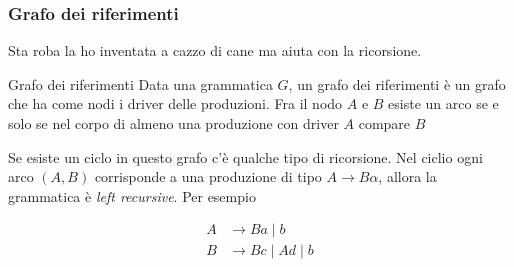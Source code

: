 \subsubsection{Grafo dei riferimenti}\label{grafo dei riferimenti}
Sta roba la ho inventata a cazzo di cane ma aiuta con la ricorsione. 
\begin{definizione}{Grafo dei riferimenti}
	Data una grammatica $ G $, un grafo dei riferimenti è un grafo che ha come nodi i driver delle produzioni.
	Fra il nodo $ A $  e $ B $ esiste un arco se e solo se nel corpo di almeno una produzione con driver $ A $ compare $ B $
\end{definizione}
Se esiste un ciclo in questo grafo c'è qualche tipo di ricorsione. Nel ciclio ogni arco $ \left(A,B\right) $ corrisponde a una produzione di tipo $ A \rightarrow B \alpha $, allora la grammatica è \textit{left recursive}. Per esempio
\vskip3mm
\begin{minipage}[c]{0.48\textwidth}
	\begin{align*}
		A & \rightarrow Ba \mid b          \\
		B & \rightarrow  Bc \mid Ad \mid b
	\end{align*}
\end{minipage}
%
\begin{minipage}[c]{0.48\textwidth}
	\centering
\end{minipage}
